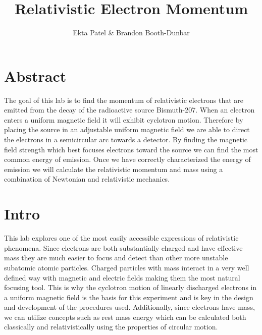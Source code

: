 



\newcommand{\ig}[2][width=4in]{\texttt{[image: \#2]}}    		
\usepackage{graphicx}					
\usepackage{amssymb}
\usepackage{pgfplotstable}
\usepackage{float}
\usepackage{caption}
\captionsetup[table]{justification=justified,singlelinecheck=false, position=bottom}


\header {\today}							
\title{Relativistic Electron Momentum}
\author{Ekta Patel \& Brandon Booth-Dunbar}



\section{Abstract}
\begin{em}
The goal of this lab is to find the momentum of relativistic electrons that are emitted from the decay of the radioactive source Bismuth-207. When an electron enters a uniform magnetic field it will exhibit cyclotron motion. Therefore by placing the source in an adjustable uniform magnetic field we are  able to direct the electrons in a semicircular arc towards a detector.  By finding the magnetic field strength which best focuses electrons toward the source we can find the most common energy of emission. Once we have correctly characterized the energy of emission we will calculate the relativistic  momentum and mass using a combination of Newtonian and relativistic mechanics. 
\end{em}

\section{Intro}
This lab explores one of the most easily accessible expressions of relativistic phenomena. Since electrons are both substantially charged and have effective mass they are much easier to focus and detect than other more unstable subatomic atomic particles. Charged particles with mass interact in a very well defined way with magnetic and electric fields making them the most natural focusing tool. This is why the cyclotron motion of linearly discharged electrons in a uniform magnetic field is the basis for this experiment and is key in the design and development of the procedures used. 
Additionally, since electrons have mass, we can utilize concepts such as rest mass energy which can be calculated both classically and relativistically using the properties of circular motion. 


